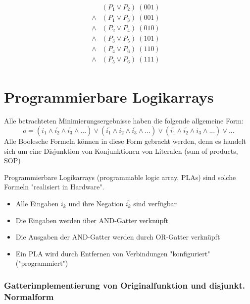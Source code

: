 \documentclass[12pt]{report}
\begin{document}
\begin{figure}[H]
  \begin{minipage}{0.4\textwidth}
    \begin{align*}
             & (P_1 \vee P_2)\ (001)   \\
      \wedge & (P_1 \vee P_3)\ (001) & \\
      \wedge & (P_2 \vee P_4)\ (010) & \\
      \wedge & (P_3 \vee P_5)\ (101) & \\
      \wedge & (P_4 \vee P_6)\ (110) & \\
      \wedge & (P_5 \vee P_6)\ (111) & \\
    \end{align*}
  \end{minipage}
\end{figure}


\pagebreak
\section{Programmierbare Logikarrays}
Alle betrachteten Minimierungsergebnisse haben die folgende allgemeine Form:
$$o = (i_1 \wedge \overline{i_2} \wedge \overline{i_3} \wedge ...) \vee (\overline{i_1} \wedge i_2 \wedge \overline{i_3} \wedge ...) \vee (\overline{i_1} \wedge \overline{i_2} \wedge i_3 \wedge ...) \vee ... $$
Alle Boolesche Formeln können in diese Form gebracht werden, denn es handelt sich um eine Disjunktion von Konjunktionen von Literalen (sum of products, SOP)

\begin{defbox} 
  Programmierbare Logikarrays (programmable logic array, PLAs) sind solche Formeln "realisiert in Hardware".
  \begin{itemize}
    \item Alle Eingaben $i_k$ und ihre Negation $\overline{i_k}$ sind verfügbar
    \item Die Eingaben werden über AND-Gatter verknüpft
    \item Die Ausgaben der AND-Gatter werden durch OR-Gatter verknüpft
    \item Ein PLA wird durch Entfernen von Verbindungen "konfiguriert" ("programmiert")
  \end{itemize}
\end{defbox}

\subsubsection{Gatterimplementierung von Originalfunktion und disjunkt. Normalform}
\end{document}

